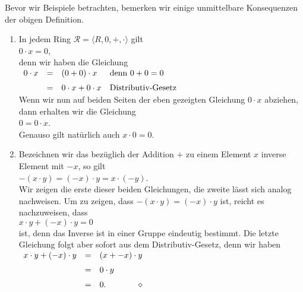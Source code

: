 \remark
Bevor wir Beispiele betrachten, bemerken wir einige unmittelbare Konsequenzen der obigen Definition.
\begin{enumerate}
\item In jedem Ring $\mathcal{R} = \langle R, 0, +, \cdot \rangle$ gilt
      \\[0.2cm]
      \hspace*{1.3cm}
      $0 \cdot x = 0$,
      \\[0.2cm]
      denn wir haben die Gleichung
      \\[0.2cm]
      \hspace*{1.3cm}
      $
      \begin{array}[t]{lcll}
        0 \cdot x & = & (0 + 0) \cdot x 
                      & \mbox{denn $0 + 0 = 0$} \\[0.2cm]
                  & = & 0 \cdot x + 0 \cdot x
                      & \mbox{Distributiv-Gesetz}
      \end{array}
      $
      \\[0.2cm]
      Wenn wir nun auf beiden Seiten der eben gezeigten Gleichung 
      $0 \cdot x$ abziehen, dann erhalten wir die Gleichung
      \\[0.2cm]
      \hspace*{1.3cm}
      $0 = 0 \cdot x$.
      \\[0.2cm]
      Genauso gilt natürlich auch $x \cdot 0 = 0$. 
\item Bezeichnen wir das bezüglich der Addition $+$ zu einem Element $x$ inverse Element mit $-x$,
      so gilt 
      \\[0.2cm]
      \hspace*{1.3cm}
      $-(x \cdot y) = (-x) \cdot y = x \cdot (-y)$.
      \\[0.2cm]
      Wir zeigen die erste dieser beiden Gleichungen, die zweite lässt sich analog nachweisen.
      Um zu zeigen, dass $-(x \cdot y) = (-x) \cdot y$ ist, reicht es nachzuweisen, dass
      \\[0.2cm]
      \hspace*{1.3cm}
      $x \cdot y + (-x) \cdot y = 0$
      \\[0.2cm]
      ist, denn das Inverse ist in einer Gruppe eindeutig bestimmt.  Die letzte Gleichung folgt aber sofort
      aus dem Distributiv-Gesetz, denn wir haben
      \\[0.2cm]
      \hspace*{1.3cm}
      $
      \begin{array}[t]{lcl}
      x \cdot y + (-x) \cdot y & = & (x + - x) \cdot y \\[0.2cm]
                               & = & 0 \cdot y \\[0.2cm]
                               & = & 0. \hspace*{\fill} \diamond
      \end{array}
      $
\end{enumerate}


